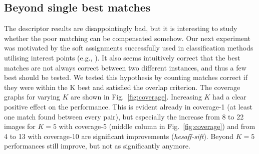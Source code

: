 \documentclass[preprint,authoryear,review]{elsarticle}
\newcommand{\commentNK}[1]{{\bf NK: #1}}
\begin{document}
\subsection{Beyond single best matches}
The descriptor results are disappointingly bad, but it is interesting to study whether
the poor matching can be compensated somehow. Our next experiment was motivated by the
soft assignments successfully used in classification methods utilising interest points
(e.g., \cite{AgaTri:2008,TuySch:2007}). It
also seems intuitively correct that the best matches are not always
correct between two different instances, and thus a few best
should be tested. We tested this hypothesis by counting matches correct if they
were within the K best and satisfied the overlap criterion. The coverage graphs
for varying $K$ are shown in Fig.~\ref{fig:coverage}. Increasing $K$ had a
clear positive effect on the performance. This is evident already in coverage-1 (at least one
match found between every pair), but especially the increase from 8 to 22 images for
 $K=5$ with coverage-5 (middle column in Fig.~\ref{fig:coverage}) and from 4 to 13 with
coverage-10 are significant improvements (\textit{hesaff-sift}).
Beyond $K=5$ performances still improve, but not as significantly anymore.
\end{document}
